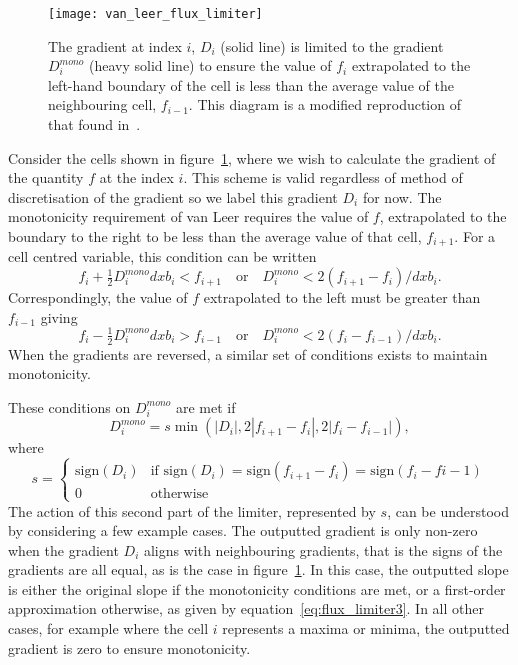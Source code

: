 \begin{figure}[t]
  \centering
  \texttt{[image: van\_leer\_flux\_limiter]}
  \caption{The gradient at index $i$, $D_i$ (solid line) is limited to the gradient $D_i^{mono}$ (heavy solid line) to ensure the value of $f_i$ extrapolated to the left-hand boundary of the cell is less than the average value of the neighbouring cell, $f_{i-1}$. This diagram is a modified reproduction of that found in~\cite{vanleerUltimateConservativeDifference1997}.}%
  \label{fig:van_leer_flux_limiter}
\end{figure}

Consider the cells shown in figure~\ref{fig:van_leer_flux_limiter}, where we wish to calculate the gradient of the quantity $f$ at the index $i$. This scheme is valid regardless of method of discretisation of the gradient so we label this gradient $D_i$ for now. The monotonicity requirement of van Leer requires the value of $f$, extrapolated to the boundary to the right to be less than the average value of that cell, $f_{i+1}$. For a cell centred variable, this condition can be written
\begin{equation}
  \label{eq:flux_limiter1}
f_i + \tfrac{1}{2}D_i^{mono} dxb_i < f_{i+1} \quad \text{or} \quad D_i^{mono} < 2 (f_{i+1} - f_i) / dxb_i.
\end{equation}
Correspondingly, the value of $f$ extrapolated to the left must be greater than $f_{i-1}$ giving
\begin{equation}
  \label{eq:flux_limiter2}
f_i - \tfrac{1}{2}D_i^{mono} dxb_i > f_{i-1} \quad \text{or} \quad D_i^{mono} < 2 (f_{i} - f_{i-1}) / dxb_i.
\end{equation}
When the gradients are reversed, a similar set of conditions exists to maintain monotonicity.

These conditions on $D_i^{mono}$ are met if
\begin{equation}
  \label{eq:flux_limiter3}
D_i^{mono} = s \min(|D_i|, 2 | f_{i+1} - f_i |, 2 |f_i - f_{i-1}|),
\end{equation}
where
\begin{equation}
  \label{eq:flux_limiter4}
s =
\left\{
	\begin{array}{ll}
		\text{sign}(D_i)  & \mbox{if } \text{sign}(D_i) = \text{sign}(f_{i+1} - f_i) = \text{sign}(f_{i} - f{i-1}) \\
		0 & \mbox{otherwise}
	\end{array}
\right.
\end{equation}
The action of this second part of the limiter, represented by $s$, can be understood by considering a few example cases. The outputted gradient is only non-zero when the gradient $D_i$ aligns with neighbouring gradients, that is the signs of the gradients are all equal, as is the case in figure~\ref{fig:van_leer_flux_limiter}. In this case, the outputted slope is either the original slope if the monotonicity conditions are met, or a first-order approximation otherwise, as given by equation~\ref{eq:flux_limiter3}. In all other cases, for example where the cell $i$ represents a maxima or minima, the outputted gradient is zero to ensure monotonicity.

